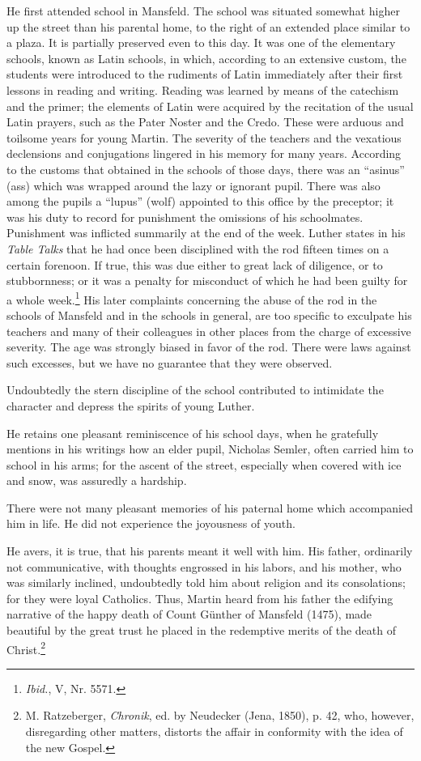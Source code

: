 He first attended school in Mansfeld. The school was situated somewhat higher up the street than his parental home, to the right of an
extended place similar to a plaza. It is partially preserved even to this
day. It was one of the elementary schools, known as Latin schools,
in which, according to an extensive custom, the students were introduced to the rudiments of Latin immediately after their first lessons
in reading and writing. Reading was learned by means of the catechism and the primer; the elements of Latin were acquired by the
recitation of the usual Latin prayers, such as the Pater Noster and
the Credo. These were arduous and toilsome years for young Martin.
The severity of the teachers and the vexatious declensions and conjugations lingered in his memory for many years. According to the
customs that obtained in the schools of those days, there was an
“asinus” (ass) which was wrapped around the lazy or ignorant
pupil. There was also among the pupils a “lupus” (wolf) appointed
to this office by the preceptor; it was his duty to record for punishment the omissions of his schoolmates. Punishment was inflicted
summarily at the end of the week. Luther states in his \textit{Table Talks}
that he had once been disciplined with the rod fifteen times on a
certain forenoon. If true, this was due either to great lack of
diligence, or to stubbornness; or it was a penalty for misconduct of
which he had been guilty for a whole week.\footnote{\textit{Ibid.}, V, Nr. 5571.}
His later complaints concerning the abuse of the rod in the schools of Mansfeld and in
the schools in general, are too specific to exculpate his teachers and
many of their colleagues in other places from the charge of excessive
severity. The age was strongly biased in favor of the rod. There
were laws against such excesses, but we have no guarantee that they
were observed.

Undoubtedly the stern discipline of the school contributed to
intimidate the character and depress the spirits of young Luther.

He retains one pleasant reminiscence of his school days, when he
gratefully mentions in his writings how an elder pupil, Nicholas
Semler, often carried him to school in his arms; for the ascent of the
street, especially when covered with ice and snow, was assuredly a
hardship.

There were not many pleasant memories of his paternal home
which accompanied him in life. He did not experience the joyousness
of youth.

He avers, it is true, that his parents meant it well with him. His
father, ordinarily not communicative, with thoughts engrossed in
his labors, and his mother, who was similarly inclined, undoubtedly
told him about religion and its consolations; for they were loyal
Catholics. Thus, Martin heard from his father the edifying narrative
of the happy death of Count Günther of Mansfeld (1475), made
beautiful by the great trust he placed in the redemptive merits of
the death of Christ.\footnote{
M. Ratzeberger, \textit{Chronik}, ed. by Neudecker (Jena, 1850), p. 42, who, however, disregarding other matters, distorts the affair in conformity with the idea of the new Gospel.}

